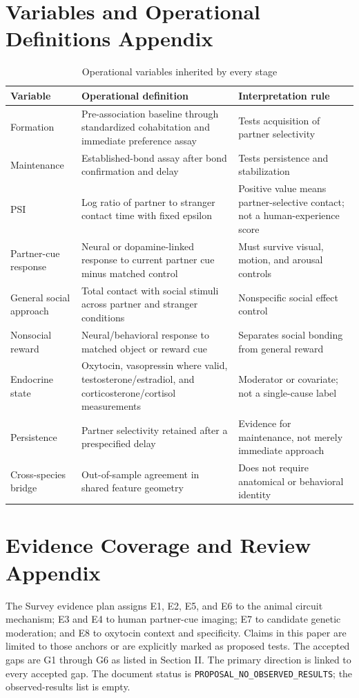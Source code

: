 \documentclass[conference]{IEEEtran}
\begin{document}
\section{Variables and Operational Definitions Appendix}
\begin{table}[h]
\caption{Operational variables inherited by every stage}
\label{tab:variables}
\centering
\small
\begin{tabularx}{\textwidth}{p{}p{}p{}}
\toprule
Variable & Operational definition & Interpretation rule \\
\midrule
Formation & Pre-association baseline through standardized cohabitation and immediate preference assay & Tests acquisition of partner selectivity \\
Maintenance & Established-bond assay after bond confirmation and delay & Tests persistence and stabilization \\
PSI & Log ratio of partner to stranger contact time with fixed epsilon & Positive value means partner-selective contact; not a human-experience score \\
Partner-cue response & Neural or dopamine-linked response to current partner cue minus matched control & Must survive visual, motion, and arousal controls \\
General social approach & Total contact with social stimuli across partner and stranger conditions & Nonspecific social effect control \\
Nonsocial reward & Neural/behavioral response to matched object or reward cue & Separates social bonding from general reward \\
Endocrine state & Oxytocin, vasopressin where valid, testosterone/estradiol, and corticosterone/cortisol measurements & Moderator or covariate; not a single-cause label \\
Persistence & Partner selectivity retained after a prespecified delay & Evidence for maintenance, not merely immediate approach \\
Cross-species bridge & Out-of-sample agreement in shared feature geometry & Does not require anatomical or behavioral identity \\
\bottomrule
\end{tabularx}
\end{table}

\section{Evidence Coverage and Review Appendix}
The Survey evidence plan assigns E1, E2, E5, and E6 to the animal circuit mechanism; E3 and E4 to human partner-cue imaging; E7 to candidate genetic moderation; and E8 to oxytocin context and specificity. Claims in this paper are limited to those anchors or are explicitly marked as proposed tests. The accepted gaps are G1 through G6 as listed in Section II. The primary direction is linked to every accepted gap. The document status is \texttt{PROPOSAL\_NO\_OBSERVED\_RESULTS}; the observed-results list is empty.
\end{document}
